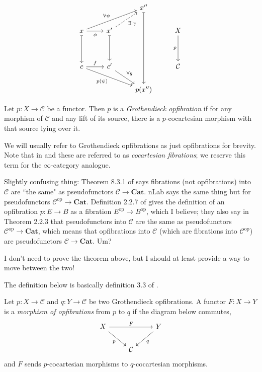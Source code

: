 \documentclass{MetricNotes2023}
\begin{document}
\[\begin{tikzcd}
 & & x'' \arrow[dddd, mapsto, ""] & \\
x \arrow[r, swap, "\phi"] \arrow[dd, mapsto, swap, ""] \arrow[urr, "\forall \psi"] & x' \arrow[dd, mapsto, swap, ""] \arrow[ur, dashrightarrow, swap, "\exists! \gamma"] & & X \arrow[dd, swap, "p"] \\
& & & \\
c \arrow[r, "f"] \arrow[rrd, swap, "p(\psi)"] & c' \arrow[rd, "\forall g"]  & & \mathcal{C}\\
 & & p(x'') & 
\end{tikzcd}\]


\begin{definition}\label{opfibration}
Let \(p : X \to \mathcal{C}\) be a functor. Then \(p\) is a \textit{Grothendieck opfibration} if for any morphism of \(\mathcal{C}\) and any lift of its source, there is a \(p\)-cocartesian morphism with that source lying over it.
\end{definition}

We will usually refer to Grothendieck opfibrations as just opfibrations for brevity. Note that in \autocite{symmetricmonoidal} and \autocite{lurie2008higher} these are referred to as \textit{cocartesian fibrations}; we reserve this term for the \(\infty\)-category analogue. 

Slightly confusing thing: Theorem 8.3.1 of \autocite{categorical} says fibrations (not opfibrations) into \(\mathcal{C}\) are ``the same" as pseudofunctors \(\mathcal{C} \to \textbf{Cat}\). nLab says the same thing but for pseudofunctors \(\mathcal{C}^{\text{op}}\to \textbf{Cat}\). Definition 2.2.7 of \autocite{fibrational_notions} gives the definition of an opfibration \(p : E \to B\) as a fibration \(E^{\text{op}}\to B^{\text{op}}\), which I believe; they also say in Theorem 2.2.3 that pseudofunctors into \(\mathcal{C}\) are the same as pseudofunctors \(\mathcal{C}^{\text{op}}\to \textbf{Cat}\), which means that opfibrations into \(\mathcal{C}\) (which are fibrations into \(\mathcal{C}^{\text{op}}\)) are pseudofunctors \(\mathcal{C} \to \textbf{Cat}\). Um? 

I don't need to prove the theorem above, but I should at least provide a way to move between the two!

The definition below is basically definition 3.3 of \autocite{symmetricmonoidal}.

\begin{definition}
Let \(p : X \to \mathcal{C}\) and \(q : Y \to \mathcal{C}\) be two Grothendieck opfibrations. A functor \(F : X \to Y\) is a \textit{morphism of opfibrations} from \(p\) to \(q\) if the diagram below commutes,
\[\begin{tikzcd}
X \arrow[rd, swap, "p"] \arrow[rr, "F"]  & & Y \arrow[ld, "q"]  \\
& \mathcal{C}  & 
\end{tikzcd}\]
and \(F\) sends \(p\)-cocartesian morphisms to \(q\)-cocartesian morphisms. 
\end{definition}
\end{document}
